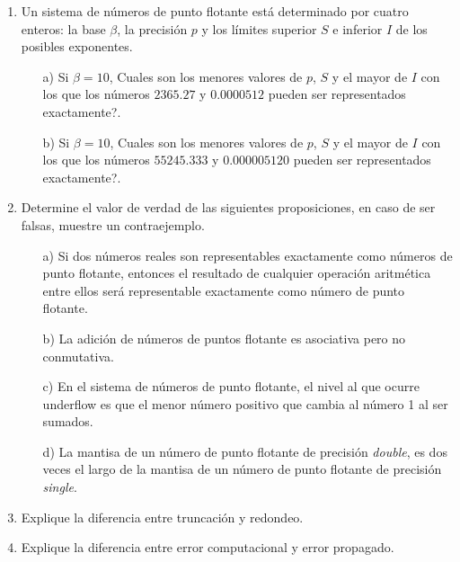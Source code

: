 \documentclass[11pt]{article}
\begin{document}
\begin{enumerate}

\item Un sistema de n\'umeros de punto flotante est\'a determinado por cuatro enteros: la base $\beta$, la precisi\'on 
$p$ y los l\'imites superior $S$ e inferior $I$ de los posibles exponentes.
\begin{itemize}
 \item[a)] Si $\beta=10$, \textquestiondown Cuales son los menores valores de $p$, $S$ y el mayor de $I$ con los que los n\'umeros 
 $2365.27$ y $0.0000512$ pueden ser representados exactamente?.
 \item[b)] Si $\beta=10$, \textquestiondown Cuales son los menores valores de $p$, $S$ y el mayor de $I$ con los que los n\'umeros 
 $55245.333$ y $0.000005120$ pueden ser representados exactamente?.
\end{itemize}

\item Determine el valor de verdad de las siguientes proposiciones, en caso de ser falsas, muestre un 
contraejemplo.
\begin{itemize}
 \item[a)] Si dos n\'umeros reales son representables exactamente como n\'umeros de punto flotante, entonces el resultado 
 de cualquier operaci\'on aritm\'etica entre ellos ser\'a representable exactamente como n\'umero de punto flotante.
 \item[b)] La adici\'on de n\'umeros de puntos flotante es asociativa pero no conmutativa.
 \item[c)] En el sistema de n\'umeros de punto flotante, el nivel al que ocurre underflow es que el menor n\'umero positivo que 
 cambia al n\'umero 1 al ser sumados.
 \item[d)] La mantisa de un n\'umero de punto flotante de precisi\'on \textit{double}, es dos veces el largo de la mantisa de un 
 n\'umero de punto flotante de precisi\'on \textit{single}.
\end{itemize}

\item Explique la diferencia entre truncaci\'on y redondeo.

\item Explique la diferencia entre error computacional y error propagado.

\end{enumerate}
\end{document}
